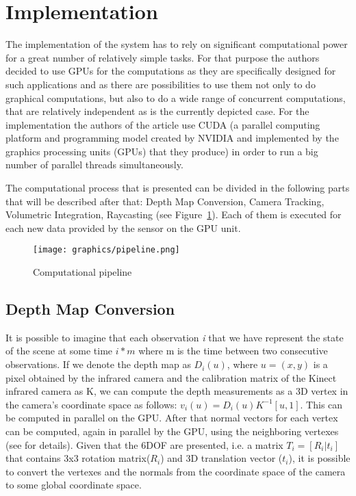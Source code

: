 \documentclass[12pt, a4paper]{article}
\theoremstyle{plain}
\begin{document}
\section{Implementation} %
\label{sec:Implementation}
  The implementation of the system has to rely on significant computational
  power for a great number of relatively simple tasks. For that purpose the
  authors decided to use GPUs for the computations as they are specifically
  designed for such applications and as there are possibilities to use them not
  only to do graphical computations, but also to do a wide range of concurrent
  computations, that are relatively independent as is the currently depicted
  case. For the implementation the authors of the article use CUDA (a parallel
  computing platform and programming model created by NVIDIA and implemented by
  the graphics processing units (GPUs) that they produce) in order to run a big
  number of parallel threads simultaneously. 

  The computational process that is presented can be divided in the following
  parts that will be described after that: Depth Map Conversion, Camera
  Tracking, Volumetric Integration, Raycasting (see Figure~\ref{fig:pipeline}).
  Each of them is executed for each new data provided by the sensor on the GPU
  unit.

  \begin{figure}[h]
    \centering
    \texttt{[image: graphics/pipeline.png]}
    \caption{Computational pipeline}
    \label{fig:pipeline}
  \end{figure}

  \subsection{Depth Map Conversion} %
  \label{sub:Depth Map Conversion}
    It is possible to imagine that each observation \emph{i} that we have
    represent the state of the scene at some time $i * m$ where m is the time
    between two consecutive observations. If we denote the depth map as
    $D_i(u)$, where $u = (x, y)$ is a pixel obtained by the infrared camera and
    the calibration matrix of the Kinect infrared camera as K, we can compute
    the depth measurements as a 3D vertex in the camera's coordinate space as
    follows: $v_i(u) = D_i(u) K ^ {-1}[u, 1]$. This can be computed in parallel
    on the GPU. After that normal vectors for each vertex can be computed, again
    in parallel by the GPU, using the neighboring vertexes (see
    \cite{kinectfusion} for details).
    Given that the 6DOF are presented, i.e. a matrix $T_i = [R_i|t_i]$ that
    contains 3x3 rotation matrix($R_i$) and 3D translation vector ($t_i$), it is
    possible to convert the vertexes and the normals from the coordinate space
    of the camera to some global coordinate space.
\end{document}
